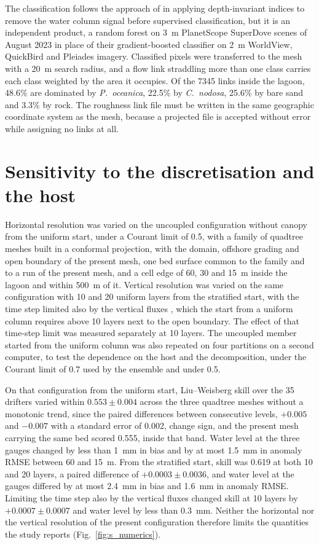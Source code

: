 \documentclass[12pt]{article}
\begin{document}
The classification follows the approach of \citet{Maltese2025} in applying
depth-invariant indices to remove the water column signal before supervised
classification, but it is an independent product, a random forest on 3~m
PlanetScope SuperDove scenes of August 2023 in place of their gradient-boosted
classifier on 2~m WorldView, QuickBird and Pleiades imagery. Classified pixels
were transferred to the mesh with a 20~m search radius, and a flow link
straddling more than one class carries each class weighted by the area it
occupies. Of the 7345 links inside the lagoon, 48.6\% are dominated by
\emph{P.\ oceanica}, 22.5\% by \emph{C.\ nodosa}, 25.6\% by bare sand and 3.3\%
by rock. The roughness link file must be written in the same geographic
coordinate system as the mesh, because a projected file is accepted without
error while assigning no links at all.

\section{Sensitivity to the discretisation and the host}
\label{sec:s_numerics}

Horizontal resolution was varied on the uncoupled configuration
without canopy from the uniform start, under a Courant limit of 0.5, with a
family of quadtree meshes built in a conformal projection, with the domain,
offshore grading and open boundary of the present mesh, one bed surface common
to the family and to a run of the present mesh, and a cell edge of 60, 30 and
15~m inside the lagoon and within 500~m of it. Vertical resolution was varied
on the same configuration with 10 and 20 uniform layers from the stratified
start, with the time step limited also by the vertical fluxes
\citep{Deltares2025}, which the start from a uniform column requires above 10
layers next to the open boundary. The effect of that time-step limit was
measured separately at 10 layers. The uncoupled member started from the uniform
column was also repeated on four partitions on a second computer, to test the
dependence on the host and the decomposition, under the Courant limit of 0.7
used by the ensemble and under 0.5.

On that configuration from the uniform start, Liu--Weisberg skill over the 35 drifters varied within $0.553 \pm 0.004$
across the three quadtree meshes without a monotonic trend, since the paired
differences between consecutive levels, $+0.005$ and $-0.007$ with a standard
error of 0.002, change sign, and the present mesh carrying the same bed scored
0.555, inside that band. Water level at the three gauges changed by less than
1~mm in bias and by at most 1.5~mm in anomaly RMSE between 60 and 15~m. From
the stratified start, skill was 0.619 at both 10 and 20 layers, a paired
difference of $+0.0003 \pm 0.0036$, and water level at the gauges differed by
at most 2.4~mm in bias and 1.6~mm in anomaly RMSE. Limiting the time step also
by the vertical fluxes changed skill at 10 layers by $+0.0007 \pm 0.0007$ and
water level by less than 0.3~mm. Neither the horizontal nor the vertical
resolution of the present configuration therefore limits the quantities the
study reports (Fig.~\ref{fig:s_numerics}).
\end{document}
